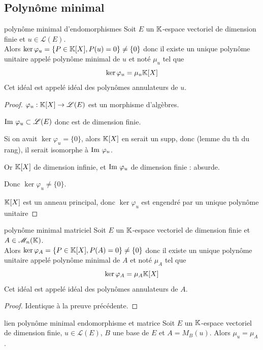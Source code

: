 \subsection{Polynôme minimal }

\begin{theoreme}{polynôme minimal d'endomorphismes}{}
    Soit $E$ un $\mathbb{K}$-espace vectoriel de dimension finie et $u \in \mathscr L(E)$.\\
    Alors $\ker \varphi_u  = \{P \in \mathbb{K}[X], P(u) = 0\} \neq \{0\}$ donc il existe un unique 
    polynôme unitaire appelé polynôme minimal de $u$ et noté $\mu_u$ tel que 
    $$\ker \varphi_u = \mu_u \mathbb{K}[X]$$
    Cet idéal est appelé idéal des polynômes annulateurs de $u$.
\end{theoreme}


\begin{proof}
    $\varphi_u: \mathbb{K}[X] \to \mathscr L(E)$ est un morphisme d'algèbres.

    $\operatorname{Im} \, \varphi_u \subset \mathscr L(E)$ donc est de dimension finie.

    Si on avait $\ker \varphi_u = \{0\}$, alors $\mathbb{K}[X]$ en serait un supp, 
    donc (lemme du th du rang), il serait isomorphe à $\operatorname{Im} \, \varphi_u$.

    Or $\mathbb{K}[X]$ de dimension infinie, et $\operatorname{Im} \, \varphi_u$ de dimension finie : absurde. 

    Donc $\ker \varphi_u \neq \{0\}$.

    $\mathbb{K}[X]$ est un anneau principal, donc $\ker \varphi_u$ est engendré par un unique polynôme unitaire
\end{proof}

\begin{theoreme}{polynôme minimal matriciel}{}
    Soit $E$ un $\mathbb{K}$-espace vectoriel de dimension finie et $A \in \mathscr M_n(\mathbb{K})$. \\
    Alors $\ker \varphi_A = \{P \in \mathbb{K}[X], P(A) = 0\} \neq \{0\}$ donc il existe un unique
    polynôme unitaire appelé polynôme minimal de $A$ et noté $\mu_A$ tel que
    $$\ker \varphi_A = \mu_A \mathbb{K}[X]$$
    Cet idéal est appelé idéal des polynômes annulateurs de $A$.
\end{theoreme}

\begin{proof}
    Identique à la preuve précédente.
\end{proof}

\begin{theoreme}{lien polynôme minimal endomorphisme et matrice}{}
    Soit $E$ un $\mathbb{K}$-espace vectoriel de dimension finie, $u \in \mathscr L(E)$, $B$ une base de $E$ et $A = M_B(u)$.
    Alors $\mu_u = \mu_A$.
\end{theoreme}


